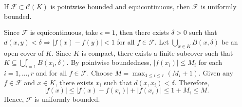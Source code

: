 \begin{theorem}
If $\mathcal{F} \subset \mathcal{C}(K)$ is pointwise bounded and equicontinuous, then $\mathcal{F}$ is uniformly bounded.
\end{theorem}
\begin{pfbox}
Since $\mathcal{F}$ is equicontinuous, take $\epsilon = 1$, then there exists $\delta > 0$ such that $d(x,y) < \delta \Rightarrow |f(x) - f(y)| < 1$ for all $f \in \mathcal{F}$.
Let $\displaystyle\bigcup_{x \in K} B(x, \delta)$ be an open cover of $K$. Since $K$ is compact, there exists a finite subcover such that $K \subseteq \displaystyle\bigcup_{i=1}^r B(x_i, \delta)$.
By pointwise boundedness, $|f(x_i)| \le M_i$ for each $i = 1, \dots, r$ and for all $f \in \mathcal{F}$.
Choose $M = \displaystyle\max_{1 \le i \le r} (M_i + 1)$.
Given any $f \in \mathcal{F}$ and $x \in K$, there exists $x_i$ such that $d(x, x_i) < \delta$. Therefore,
$$|f(x)| \le |f(x) - f(x_i)| + |f(x_i)| \le 1 + M_i \le M.$$
Hence, $\mathcal{F}$ is uniformly bounded.
\end{pfbox}


